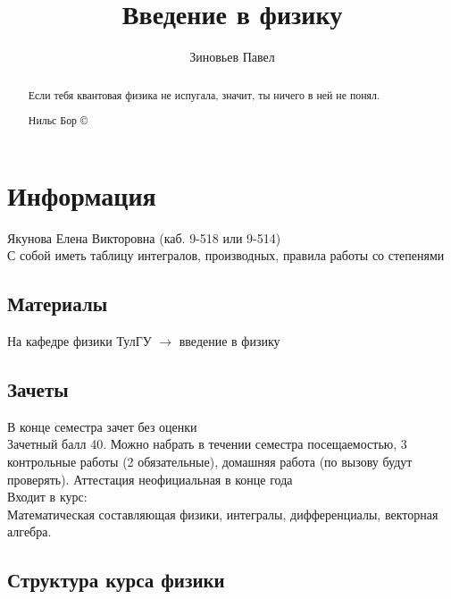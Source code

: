 \documentclass[a4paper, 11pt, oneside]{article}
\title{Введение в физику}
\author{Зиновьев Павел}
\begin{document}
\maketitle
\begin{abstract}
	Если тебя квантовая физика не испугала, значит, ты ничего в ней не понял. 
	\begin{flushright}
		Нильс Бор \copyright 
	\end{flushright}
\end{abstract}
\newpage
\tableofcontents
\contentsname
\newpage

\section{Информация}
Якунова Елена Викторовна (каб. 9-518 или 9-514)\\
С собой иметь таблицу интегралов, производных, правила работы со степенями

\subsection{Материалы}
На кафедре физики ТулГУ $\rightarrow$ введение в физику
\subsection{Зачеты}
В конце семестра зачет без оценки\\
Зачетный балл 40. Можно набрать в течении семестра посещаемостью, 3 контрольные работы (2 обязательные), домашняя работа (по вызову будут проверять). Аттестация неофициальная в конце года\\
Входит в курс:\\
Математическая составляющая физики, интегралы, дифференциалы, векторная алгебра. 

\subsection{Структура курса физики}
\end{document}

